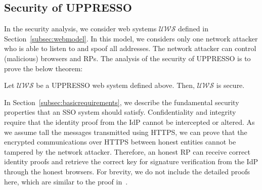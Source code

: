 \subsection{Security of UPPRESSO}
In the security analysis, we consider web systems $\mathcal{UWS}$ defined in Section~\ref{subsec:webmodel}. In this model, we considers only
one network attacker who is able to listen to and spoof all addresses. The network attacker can control (malicious) browsers and RPs.
The analysis of the security of UPPRESSO is to prove the below theorem:
\begin{theorem}
Let $\mathcal{UWS}$ be a UPPRESSO web system defined above. Then, $\mathcal{UWS}$ is secure.
\label{the:secure}
\end{theorem}
\vspace{-\topsep}
In Section~\ref{subsec:basicrequirements}, we describe the fundamental security properties that an SSO system should satisfy. Confidentiality and integrity require that the identity proof from the IdP cannot be intercepted or altered. As we assume tall the messages transmitted using HTTPS, we can prove that the encrypted communications over HTTPS between honest entities cannot be tampered by the network attacker. Therefore, an honest RP can receive correct identity proofs and retrieve the correct key for signature verification from the IdP through the honest browsers. For brevity, we do not include the detailed proofs here, which are similar to the proof in~\cite{SPRESSO}.


